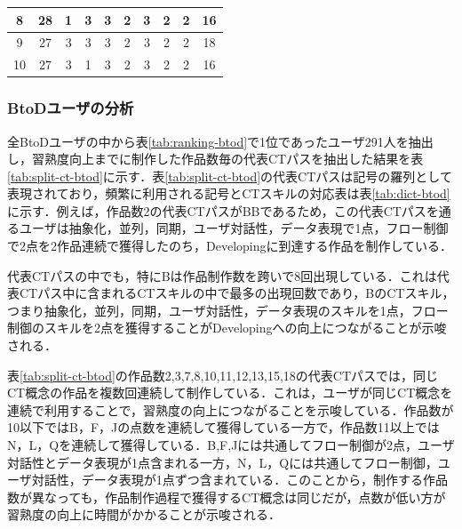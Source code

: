 \documentclass[11pt,dvipdfmx]{jreport}
\begin{document}
\begin{table}[]
\begin{tabular}{c|c|cccccccc}
8                   & 28                   & \multicolumn{1}{c|}{1} & \multicolumn{1}{c|}{3} & \multicolumn{1}{c|}{3} & \multicolumn{1}{c|}{2} & \multicolumn{1}{c|}{3} & \multicolumn{1}{c|}{2} & \multicolumn{1}{c|}{2} & 16  \\ \hline
9                   & 27                   & \multicolumn{1}{c|}{3} & \multicolumn{1}{c|}{3} & \multicolumn{1}{c|}{3} & \multicolumn{1}{c|}{2} & \multicolumn{1}{c|}{3} & \multicolumn{1}{c|}{2} & \multicolumn{1}{c|}{2} & 18 \\ \hline
10                  & 27                   & \multicolumn{1}{c|}{3} & \multicolumn{1}{c|}{1} & \multicolumn{1}{c|}{3} & \multicolumn{1}{c|}{2} & \multicolumn{1}{c|}{3} & \multicolumn{1}{c|}{2} & \multicolumn{1}{c|}{2} & 16  \\ \hline
\end{tabular}
\end{table}

\subsubsection*{BtoDユーザの分析}

全BtoDユーザの中から表\ref{tab:ranking-btod}で1位であったユーザ291人を抽出し，習熟度向上までに制作した作品数毎の代表CTパスを抽出した結果を表\ref{tab:split-ct-btod}に示す．表\ref{tab:split-ct-btod}の代表CTパスは記号の羅列として表現されており，頻繁に利用される記号とCTスキルの対応表は表\ref{tab:dict-btod}に示す．例えば，作品数2の代表CTパスがBBであるため，この代表CTパスを通るユーザは抽象化，並列，同期，ユーザ対話性，データ表現で1点，フロー制御で2点を2作品連続で獲得したのち，Developingに到達する作品を制作している．

代表CTパスの中でも，特にBは作品制作数を跨いで8回出現している．これは代表CTパス中に含まれるCTスキルの中で最多の出現回数であり，BのCTスキル，つまり抽象化，並列，同期，ユーザ対話性，データ表現のスキルを1点，フロー制御のスキルを2点を獲得することがDevelopingへの向上につながることが示唆される．

表\ref{tab:split-ct-btod}の作品数2,3,7,8,10,11,12,13,15,18の代表CTパスでは，同じCT概念の作品を複数回連続して制作している．これは，ユーザが同じCT概念を連続で利用することで，習熟度の向上につながることを示唆している．作品数が10以下ではB，F，Jの点数を連続して獲得している一方で，作品数11以上ではN，L，Qを連続して獲得している．B,F,Jには共通してフロー制御が2点，ユーザ対話性とデータ表現が1点含まれる一方，N，L，Qには共通してフロー制御，ユーザ対話性，データ表現が1点ずつ含まれている．このことから，制作する作品数が異なっても，作品制作過程で獲得するCT概念は同じだが，点数が低い方が習熟度の向上に時間がかかることが示唆される．
\end{document}
